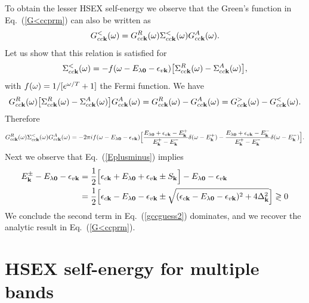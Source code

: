 \documentclass[twocolumn,aps,a4paper,superscriptaddress]{revtex4-2}
\begin{document}
\begin{widetext}
To obtain the lesser HSEX self-energy we observe that
the Green's function in Eq.~(\ref{G<ccprm}) can also be
written as
\begin{align}
G^{<}_{cc{\mathbf k}}(\omega)=G^{R}_{cc{\mathbf k}}(\omega)\Sigma^{<}_{cc{\mathbf k}}(\omega)G^{A}_{cc{\mathbf k}}(\omega).
\label{G<ccguess}
\end{align}
Let us show that this relation is satisfied for
\begin{align}
\Sigma^{<}_{cc{\mathbf k}}(\omega)=-f(\omega-E_{\lambda\mathbf 0}-\epsilon_{v{\mathbf k}})
\big[\Sigma^{R}_{cc{\mathbf k}}(\omega)-\Sigma^{A}_{cc{\mathbf k}}(\omega)\big],
\label{twobself2}
\end{align}
with $f(\omega)=1/[e^{\omega/T}+1]$ the Fermi function.
We have
\begin{align}
G^{R}_{cc{\mathbf k}}(\omega)\big[\Sigma^{R}_{cc{\mathbf k}}(\omega)-\Sigma^{A}_{cc{\mathbf k}}(\omega)\big]
G^{A}_{cc{\mathbf k}}(\omega)=G^{R}_{cc{\mathbf k}}(\omega)-G^{A}_{cc{\mathbf k}}(\omega)=
G^{>}_{cc{\mathbf k}}(\omega)-G^{<}_{cc{\mathbf k}}(\omega).
\end{align}
Therefore
\begin{align}
G^{R}_{cc{\mathbf k}}(\omega)\Sigma^{<}_{cc{\mathbf k}}(\omega)G^{A}_{cc{\mathbf k}}(\omega)=
-2\pi i f(\omega-E_{\lambda\mathbf 0}-\epsilon_{v{\mathbf k}})
\Big[\frac{E_{\lambda\mathbf 0}+\epsilon_{v{\mathbf k}}-E^{+}_{{\mathbf k}}}
{E^{+}_{{\mathbf k}}-E^{-}_{{\mathbf k}}}
\delta(\omega-E^{+}_{{\mathbf k}})-\frac{E_{\lambda\mathbf 0}+\epsilon_{v{\mathbf k}}-E^{-}_{{\mathbf k}}}
{E^{+}_{{\mathbf k}}-E^{-}_{{\mathbf k}}}
\delta(\omega-E^{-}_{{\mathbf k}})\Big].
\label{gccguess2}
\end{align}
Next we observe that Eq.~(\ref{Eplusminus}) implies
\begin{align}
E^{\pm}_{{\mathbf k}}-E_{\lambda\mathbf 0}-\epsilon_{v{\mathbf k}}&=
\frac{1}{2}\Big[
\epsilon_{c{\mathbf k}}+E_{\lambda\mathbf 0}+\epsilon_{v{\mathbf k}}
\pm S_{{\mathbf k}}\Big]-E_{\lambda\mathbf 0}-\epsilon_{v{\mathbf k}}
\nonumber\\
&=\frac{1}{2}\Big[
\epsilon_{c{\mathbf k}}-E_{\lambda\mathbf 0}-\epsilon_{v{\mathbf k}}
\pm \sqrt{(\epsilon_{c{\mathbf k}}-E_{\lambda\mathbf 0}-\epsilon_{v{\mathbf k}})^{2}
+4\Delta_{{\mathbf k}}^{2}}\Big]\gtrless 0
\end{align}
We conclude the second term in Eq.~(\ref{gccguess2}) dominates, and
we recover the analytic result in Eq.~(\ref{G<ccprm}).

\section{HSEX self-energy for multiple bands}
\label{hsexmultbandapp}


\end{widetext}
\end{document}
